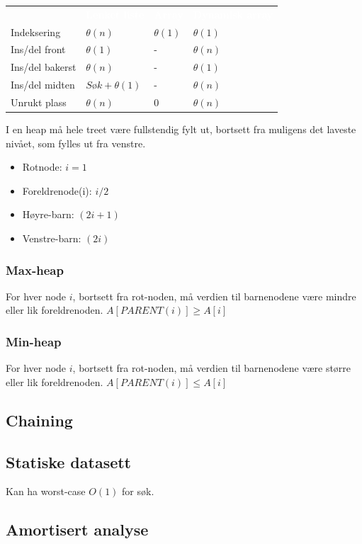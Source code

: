 \begin{table}[H]
    \label{tab:heap}
    \centering
    \begin{tabular}{|L{10em} | L{10em}| L{10em}|L{10em}|}
        \hline
        \textbf{\textcolor{white}{}} & \textbf{\textcolor{white}{Lenket liste}} & \textbf{\textcolor{white}{Array}} & \textbf{\textcolor{white}{Dynamisk array}}\\
        Indeksering & $\theta(n)$ & $\theta(1)$ & $\theta(1)$\\
        Ins/del front & $\theta(1)$ & - & $\theta(n)$\\
        Ins/del bakerst & $\theta(n)$ & - & $\theta(1)$\\
        Ins/del midten & $Søk + \theta(1)$ & - & $\theta(n)$\\
        Unrukt plass & $\theta(n)$ & 0 & $\theta(n)$\\
         \hline
    \end{tabular}
\end{table}

\noindent I en heap må hele treet være fullstendig fylt ut, bortsett fra muligens det laveste nivået, som fylles ut fra venstre.
\begin{itemize}
    \item Rotnode: $i = 1$
    \item Foreldrenode(i): $i/2$
    \item Høyre-barn: $(2i + 1)$
    \item Venstre-barn: $(2i)$
\end{itemize}

\subsubsection{Max-heap}
For hver node $i$, bortsett fra rot-noden, må verdien til barnenodene være mindre eller lik foreldrenoden. $A[PARENT(i)]\geq A[i]$

\subsubsection{Min-heap}
For hver node $i$, bortsett fra rot-noden, må verdien til barnenodene være større eller lik foreldrenoden. $A[PARENT(i)]\leq A[i]$

\subsection{Chaining}

\subsection{Statiske datasett}
Kan ha worst-case $O(1)$ for søk.

\subsection{Amortisert analyse}

